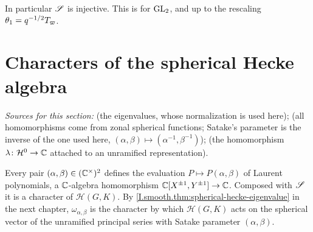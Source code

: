 \noindent In particular $\mathscr{S}$ is injective. This is
\cite[Theorem~3, p.~29, and Theorem~6\,(i), p.~45]{Sat} for $\mathrm{GL}_2$, and \cite[Proposition~37]{BumpH} up to the rescaling
$\theta_1=q^{-1/2}T_\varpi$.

\section{Characters of the spherical Hecke algebra}\label{sec:satake-characters}

{\sloppy\noindent\emph{Sources for this section:} \cite[§9, Proposition~40, p.~55]{BumpH} (the eigenvalues, whose
normalization is used here); \cite[Theorem~2, p.~27, and §5.2, p.~24]{Sat} (all homomorphisms come from zonal spherical
functions; Satake's parameter is the inverse of the one used here, $(\alpha,\beta)\mapsto(\alpha^{-1},\beta^{-1})$);
\cite[Lemma~3.9 and the paragraph after it, p.~59]{JL} (the homomorphism $\lambda\colon\mathcal H^0\to\mathbb{C}$ attached to an
unramified representation).\par}

Every pair $(\alpha,\beta)\in(\mathbb{C}^\times)^2$ defines the evaluation $P\mapsto P(\alpha,\beta)$ of Laurent polynomials, a
$\mathbb{C}$-algebra homomorphism $\mathbb{C}[X^{\pm1},Y^{\pm1}]\to\mathbb{C}$. Composed with $\mathscr{S}$ it is a character of
$\mathcal H(G,K)$. By \cref{I.smooth.thm:spherical-hecke-eigenvalue} in the next chapter, $\omega_{\alpha,\beta}$ is the
character by which $\mathcal H(G,K)$ acts on the spherical vector of the unramified principal series with Satake parameter
$(\alpha,\beta)$.

